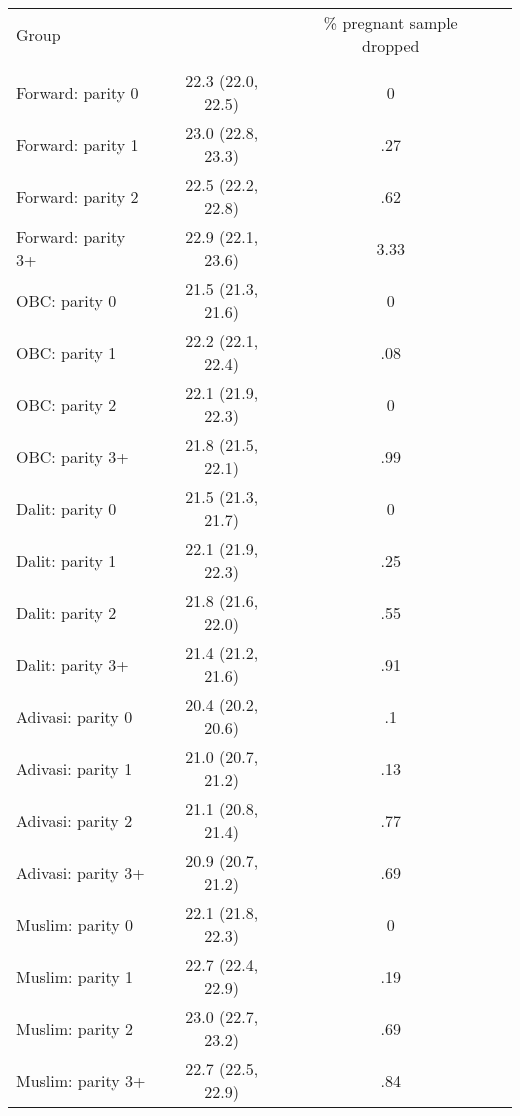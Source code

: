 \begin{tabular}{lccc}
\toprule
Group &  & \% pregnant sample dropped \\\\
\midrule
Forward: parity 0&22.3 (22.0, 22.5)&0\\
Forward: parity 1&23.0 (22.8, 23.3)&.27\\
Forward: parity 2&22.5 (22.2, 22.8)&.62\\
Forward: parity 3+&22.9 (22.1, 23.6)&3.33\\
OBC: parity 0&21.5 (21.3, 21.6)&0\\
OBC: parity 1&22.2 (22.1, 22.4)&.08\\
OBC: parity 2&22.1 (21.9, 22.3)&0\\
OBC: parity 3+&21.8 (21.5, 22.1)&.99\\
Dalit: parity 0&21.5 (21.3, 21.7)&0\\
Dalit: parity 1&22.1 (21.9, 22.3)&.25\\
Dalit: parity 2&21.8 (21.6, 22.0)&.55\\
Dalit: parity 3+&21.4 (21.2, 21.6)&.91\\
Adivasi: parity 0&20.4 (20.2, 20.6)&.1\\
Adivasi: parity 1&21.0 (20.7, 21.2)&.13\\
Adivasi: parity 2&21.1 (20.8, 21.4)&.77\\
Adivasi: parity 3+&20.9 (20.7, 21.2)&.69\\
Muslim: parity 0&22.1 (21.8, 22.3)&0\\
Muslim: parity 1&22.7 (22.4, 22.9)&.19\\
Muslim: parity 2&23.0 (22.7, 23.2)&.69\\
Muslim: parity 3+&22.7 (22.5, 22.9)&.84\\
\bottomrule
\end{tabular}
